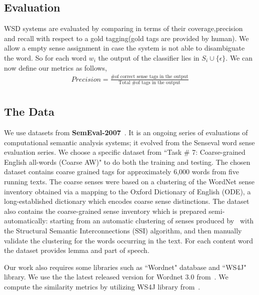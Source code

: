 \documentclass[12pt,letterpaper]{article}
\newcommand{\blue}[1]{\textcolor{RoyalBlue}{#1}}
\newcommand{\instructions}[1]{\blue{\textit{#1}}}
\begin{document}
\subsection{Evaluation}
WSD systems are evaluated by comparing in terms of their coverage,precision and recall with respect to a gold tagging(gold tags are provided by human). We allow a empty sense assignment in case the system is not able to disambiguate the word. So for each word $w_i$ the output of the classifier lies in $S_i \cup \{\epsilon\}$. We can now define  our metrics as follows,
\begin{align*}
Precision = \frac{\text{\# of correct sense tags in the output}}{\text{Total \# of tags in the output}}\\
\end{align*}
\subsection{The Data}
\label{sec:data}
We use datasets from \textbf{SemEval-2007}~\cite{semeval}. It is an ongoing series of evaluations of computational semantic analysis systems; it evolved from the Senseval word sense evaluation series. We choose a specific dataset from ``Task \# 7: Coarse-grained English all-words (Coarse AW)" to do both the training and testing. The chosen dataset contains coarse grained tags for approximately 6,000 words from five running texts. The coarse senses were based on a clustering of the WordNet sense inventory obtained via a mapping to the Oxford Dictionary of English (ODE), a long-established dictionary which encodes coarse sense distinctions. The dataset also contains the coarse-grained sense inventory which is prepared semi-automatically: starting from an automatic clustering of senses produced by~\cite{Navigli06} with the Structural Semantic Interconnections (SSI) algorithm, and then manually validate the clustering for the words occurring in the text. For each content word the dataset provides lemma and part of speech.

Our work also requires some libraries such as ``Wordnet" database and ``WS4J" library. We use the the latest released version for Wordnet 3.0 from~\cite{wordneturl}. We compute the similarity metrics by utilizing WS4J library from~\cite{WS4Jurl}.
\end{document}
